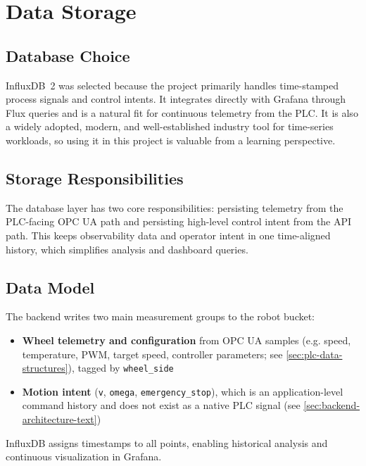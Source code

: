 \documentclass[a4paper,11pt]{article}
\begin{document}
\section{Data Storage}
\label{sec:storage}

\subsection{Database Choice}

InfluxDB~2 was selected because the project primarily handles time-stamped process signals and
control intents. It integrates directly with Grafana through Flux queries and is a natural fit for
continuous telemetry from the PLC. It is also a widely adopted, modern, and well-established
industry tool for time-series workloads, so using it in this project is valuable from a learning
perspective.

\subsection{Storage Responsibilities}

The database layer has two core responsibilities: persisting telemetry from the PLC-facing OPC UA
path and persisting high-level control intent from the API path. This keeps observability data and
operator intent in one time-aligned history, which simplifies analysis and dashboard queries.

\subsection{Data Model}

The backend writes two main measurement groups to the robot bucket:

\begin{itemize}
    \item \textbf{Wheel telemetry and configuration} from OPC UA samples
    (e.g. speed, temperature, PWM, target speed, controller parameters; see
    \autoref{sec:plc-data-structures}), tagged by
    \texttt{wheel\_side}
    \item \textbf{Motion intent} (\texttt{v}, \texttt{omega}, \texttt{emergency\_stop}), which is an
    application-level command history and does not exist as a native PLC signal (see
    \autoref{sec:backend-architecture-text})
\end{itemize}

InfluxDB assigns timestamps to all points, enabling historical analysis and continuous visualization
in Grafana.
\end{document}
